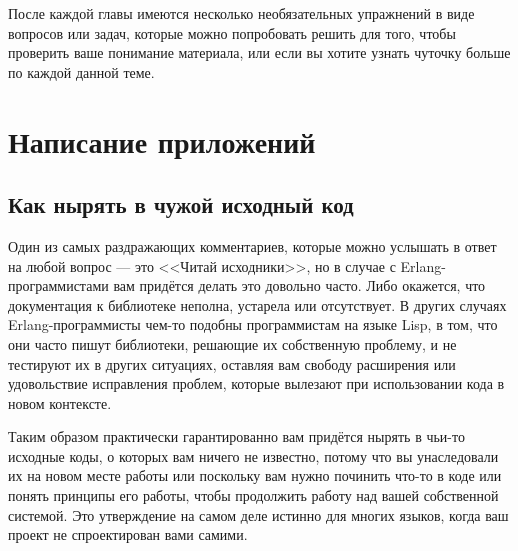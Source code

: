 \documentclass[11pt, oneside]{book}   	%
\begin{document}
После каждой главы имеются несколько необязательных упражнений в виде вопросов или задач, которые можно попробовать решить для того, чтобы проверить ваше понимание материала, или если вы хотите узнать чуточку больше по каждой данной теме.

\part{Написание приложений}
\label{part:writing-applications}

\chapter{Как нырять в чужой исходный код}
\label{chap:how-to-dive-into-a-code-base}

Один из самых раздражающих комментариев, которые можно услышать в ответ на любой вопрос --- это <<Читай исходники>>, но в случае с Erlang-программистами вам придётся делать это довольно часто. Либо окажется, что документация к библиотеке неполна, устарела или отсутствует. В других случаях Erlang-программисты чем-то подобны программистам на языке Lisp, в том, что они часто пишут библиотеки, решающие их собственную проблему, и не тестируют их в других ситуациях, оставляя вам свободу расширения или удовольствие исправления проблем, которые вылезают при использовании кода в новом контексте.

Таким образом практически гарантированно вам придётся нырять в чьи-то исходные коды, о которых вам ничего не известно, потому что вы унаследовали их на новом месте работы или поскольку вам нужно починить что-то в коде или понять принципы его работы, чтобы продолжить работу над вашей собственной системой. Это утверждение на самом деле истинно для многих языков, когда ваш проект не спроектирован вами самими.
\end{document}
